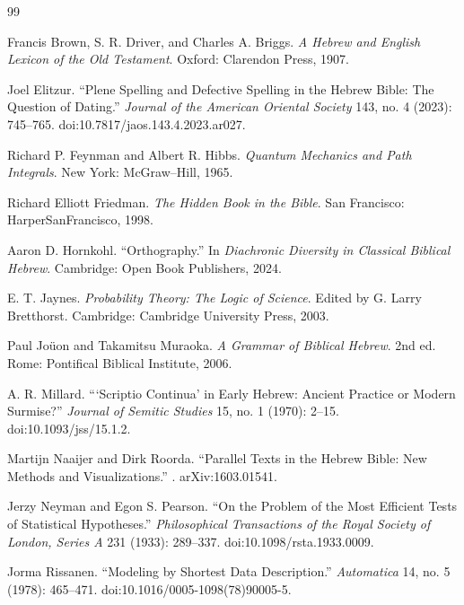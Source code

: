 \begin{thebibliography}{99}

Francis Brown, S. R. Driver, and Charles A. Briggs.
\newblock \textit{A Hebrew and English Lexicon of the Old Testament}.
\newblock Oxford: Clarendon Press, 1907.

Joel Elitzur.
\newblock ``Plene Spelling and Defective Spelling in the Hebrew Bible: The Question of Dating.''
\newblock \textit{Journal of the American Oriental Society} 143, no. 4 (2023): 745--765.
\newblock doi:10.7817/jaos.143.4.2023.ar027.

Richard P. Feynman and Albert R. Hibbs.
\newblock \textit{Quantum Mechanics and Path Integrals}.
\newblock New York: McGraw--Hill, 1965.

Richard Elliott Friedman.
\newblock \textit{The Hidden Book in the Bible}.
\newblock San Francisco: HarperSanFrancisco, 1998.

Aaron D. Hornkohl.
\newblock ``Orthography.''
\newblock In \textit{Diachronic Diversity in Classical Biblical Hebrew}.
\newblock Cambridge: Open Book Publishers, 2024.

E. T. Jaynes.
\newblock \textit{Probability Theory: The Logic of Science}.
\newblock Edited by G. Larry Bretthorst.
\newblock Cambridge: Cambridge University Press, 2003.

Paul Joüon and Takamitsu Muraoka.
\newblock \textit{A Grammar of Biblical Hebrew}.
\newblock 2nd ed. Rome: Pontifical Biblical Institute, 2006.

A. R. Millard.
\newblock ```Scriptio Continua' in Early Hebrew: Ancient Practice or Modern Surmise?''
\newblock \textit{Journal of Semitic Studies} 15, no. 1 (1970): 2--15.
\newblock doi:10.1093/jss/15.1.2.

Martijn Naaijer and Dirk Roorda.
\newblock ``Parallel Texts in the Hebrew Bible: New Methods and Visualizations.''
.
\newblock arXiv:1603.01541.

Jerzy Neyman and Egon S. Pearson.
\newblock ``On the Problem of the Most Efficient Tests of Statistical Hypotheses.''
\newblock \textit{Philosophical Transactions of the Royal Society of London, Series A} 231 (1933): 289--337.
\newblock doi:10.1098/rsta.1933.0009.

Jorma Rissanen.
\newblock ``Modeling by Shortest Data Description.''
\newblock \textit{Automatica} 14, no. 5 (1978): 465--471.
\newblock doi:10.1016/0005-1098(78)90005-5.


\end{thebibliography}
